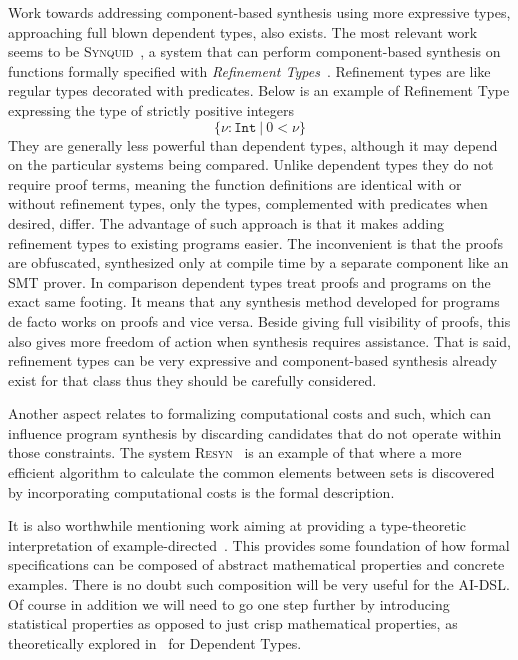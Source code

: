 \documentclass[]{report}
\begin{document}
Work towards addressing component-based synthesis using more
expressive types, approaching full blown dependent types, also exists.
The most relevant work seems to be
\textsc{Synquid}~\cite{Polikarpova2016}, a system that can perform
component-based synthesis on functions formally specified with
\emph{Refinement Types}~\cite{Flanagan2006}.  Refinement types are
like regular types decorated with predicates.  Below is an example of
Refinement Type expressing the type of strictly positive integers
$$\{\nu : \texttt{Int}\ |\ 0 < \nu\}$$
They are generally less powerful than dependent types, although it may
depend on the particular systems being compared.  Unlike dependent
types they do not require proof terms, meaning the function
definitions are identical with or without refinement types, only the
types, complemented with predicates when desired, differ.  The
advantage of such approach is that it makes adding refinement types to
existing programs easier.  The inconvenient is that the proofs are
obfuscated, synthesized only at compile time by a separate component
like an SMT prover.  In comparison dependent types treat proofs and
programs on the exact same footing.  It means that any synthesis
method developed for programs de facto works on proofs and vice versa.
Beside giving full visibility of proofs, this also gives more freedom
of action when synthesis requires assistance.  That is said,
refinement types can be very expressive and component-based synthesis
already exist for that class thus they should be carefully considered.

Another aspect relates to formalizing computational costs and such,
which can influence program synthesis by discarding candidates that do
not operate within those constraints.  The system
\textsc{Resyn}~\cite{Knoth2019} is an example of that where a more
efficient algorithm to calculate the common elements between sets is
discovered by incorporating computational costs is the formal
description.

It is also worthwhile mentioning work aiming at providing a
type-theoretic interpretation of example-directed~\cite{Frankle2016}.
This provides some foundation of how formal specifications can be
composed of abstract mathematical properties and concrete examples.
There is no doubt such composition will be very useful for the AI-DSL.
Of course in addition we will need to go one step further by
introducing statistical properties as opposed to just crisp
mathematical properties, as theoretically explored
in~\cite{Warrell2016} for Dependent Types.
\end{document}
